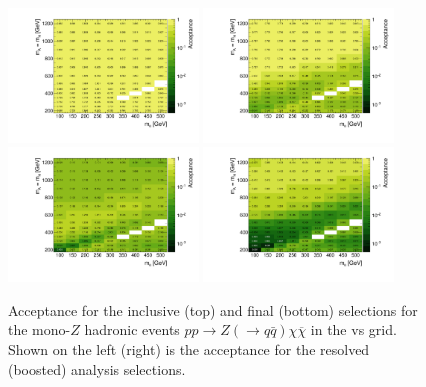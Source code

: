 \begin{figure}
\centering
\includegraphics[width=0.45\textwidth]{texinputs/04_grid/figures/monoz/hadronic/grid_mA_ma_incl_resl_acc.pdf}
\includegraphics[width=0.45\textwidth]{texinputs/04_grid/figures/monoz/hadronic/grid_mA_ma_incl_merged_acc.pdf}
\includegraphics[width=0.45\textwidth]{texinputs/04_grid/figures/monoz/hadronic/grid_mA_ma_resl_acc.pdf}
\includegraphics[width=0.45\textwidth]{texinputs/04_grid/figures/monoz/hadronic/grid_mA_ma_merged_acc.pdf}
\caption{Acceptance for the inclusive (top) and final (bottom) selections for the mono-$Z$ hadronic events 
$pp \rightarrow Z(\to q\bar{q})\chi\overline{\chi}$ in the \ma vs \mA grid. Shown on the left (right) is the acceptance for
the resolved (boosted) analysis selections.}
\label{fig:monozhad_acc_ma-mA_grid}
\end{figure}

